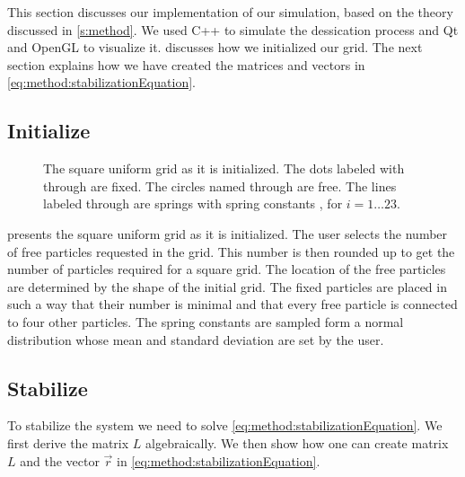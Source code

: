 This section discusses our implementation of our simulation, based on the theory discussed in \cref{s:method}. We used C++ to simulate the dessication process and  Qt\cite{qt} and OpenGL\cite{openGL} to visualize it.  discusses how we initialized our grid. The next section explains how we have created the matrices and vectors in \cref{eq:method:stabilizationEquation}.

\subsection{Initialize}
	\label{s:implementation:init}
	\begin{figure}
		\centering
		\resizebox{0.9\columnwidth}{!}{%
			\initialGrid
		}
		\caption{The square uniform grid as it is initialized. The dots labeled with  through  are fixed. The circles named  through  are free. The lines labeled  through  are springs with spring constants , for $i = 1\ldots23$.}
		\label{fig:implementation:intitialGrid}
	\end{figure}

	 presents the square uniform grid as it is initialized. 
	The user selects the number of free particles requested in the grid. This number is then rounded up to get the number of particles required for a square grid. The location of the free particles are determined by the shape of the initial grid.
	The fixed particles are placed  in such a way that their number is minimal and that every free particle is connected to four other particles. 
	The spring constants are sampled form a normal distribution whose mean and standard deviation are set by the user. 

\subsection{Stabilize}
	\label{s:implementation:stabilize}
	To stabilize the system we need to solve \cref{eq:method:stabilizationEquation}. We first derive the matrix $L$ algebraically. We then show how one can create matrix $L$ and the vector $\vec{r}$ in \cref{eq:method:stabilizationEquation}.

